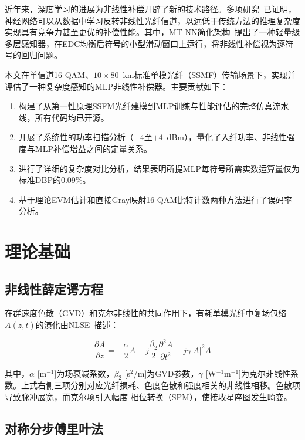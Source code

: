 \documentclass[conference]{IEEEtran}
\begin{document}
近年来，深度学习的进展为非线性补偿开辟了新的技术路径。多项研究~\cite{gdpkan2025,operator2025,mtnn2025}已证明，神经网络可以从数据中学习反转非线性光纤信道，以远低于传统方法的推理复杂度实现具有竞争力甚至更优的补偿性能。其中，MT-NN简化架构~\cite{mtnn2025}提出了一种轻量级多层感知器，在EDC均衡后符号的小型滑动窗口上运行，将非线性补偿视为逐符号的回归问题。

本文在单信道16-QAM、$10 \times 80$~km标准单模光纤（SSMF）传输场景下，实现并评估了一种复杂度感知的MLP非线性补偿器。主要贡献如下：

\begin{enumerate}
    \item 构建了从第一性原理SSFM光纤建模到MLP训练与性能评估的完整仿真流水线，所有代码均已开源。
    \item 开展了系统性的功率扫描分析（$-4$至$+4$~dBm），量化了入纤功率、非线性强度与MLP补偿增益之间的定量关系。
    \item 进行了详细的复杂度对比分析，结果表明所提MLP每符号所需实数运算量仅为标准DBP的0.09\%。
    \item 基于理论EVM估计和直接Gray映射16-QAM比特计数两种方法进行了误码率分析。
\end{enumerate}

\section{理论基础}
\label{sec:theory}

\subsection{非线性薛定谔方程}

在群速度色散（GVD）和克尔非线性的共同作用下，有耗单模光纤中复场包络$A(z, t)$的演化由NLSE~\cite{agrawal2001}描述：

\begin{equation}
\frac{\partial A}{\partial z} = -\frac{\alpha}{2}A
- j\frac{\beta_2}{2}\frac{\partial^2 A}{\partial t^2}
+ j\gamma |A|^2 A
\label{eq:nlse}
\end{equation}

其中，$\alpha$ [m$^{-1}$]为场衰减系数，$\beta_2$ [s$^2$/m]为GVD参数，$\gamma$ [W$^{-1}$m$^{-1}$]为克尔非线性系数。上式右侧三项分别对应光纤损耗、色度色散和强度相关的非线性相移。色散项导致脉冲展宽，而克尔项引入幅度-相位转换（SPM），使接收星座图发生畸变。

\subsection{对称分步傅里叶法}
\end{document}
